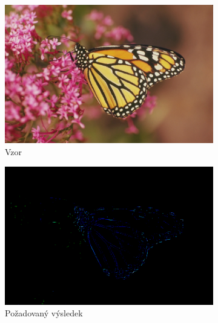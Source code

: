 \documentclass[a4paper,11pt]{scrartcl}
\begin{document}
\begin{figure}[!h]
    \centering
    \caption{Srovnání na vzoru 3}
    \label{porovnani_ex3}
    \begin{subfigure}[b]{0.32\textwidth}
        \includegraphics[width=\textwidth]{img/example3.png}
        \caption{Vzor}
        \label{fig:gull}
    \end{subfigure}
    \begin{subfigure}[b]{0.32\textwidth}
        \includegraphics[width=\textwidth]{img/example3_E.png}
        \caption{Požadovaný výsledek}
        \label{fig:gull}
    \end{subfigure}
    \\
    \begin{subfigure}[b]{0.32\textwidth}

\end{subfigure}
\end{figure}
\end{document}
